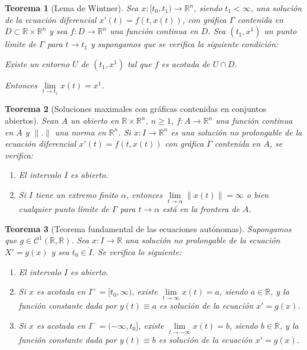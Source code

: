 \documentclass{report}
\newtheorem{theorem}{Teorema}[chapter]
\theoremstyle{remark}
\theoremstyle{remark}
\theoremstyle{remark}
\theoremstyle{definition}
\theoremstyle{definition}
\theoremstyle{definition}
\begin{document}
\begin{theorem}[Lema de Wintner]
    Sea $x: [t_0, t_1) \to \mathbb{R}^n$, siendo $t_1 < \infty$, una solución de la ecuación diferencial $x'(t) = f(t, x(t))$, con gráfica $\Gamma$ contenida en $D \subset \mathbb{R} \times \mathbb{R}^n$ y sea $f: D \to \mathbb{R}^n$ una función continua en $D$.
    Sea $(t_1, x^1)$ un punto límite de $\Gamma$ para $t \to t_1$ y supongamos que se verifica la siguiente condición:
    \begin{center}
        Existe un entorno $U$ de $(t_1, x^1)$ tal que $f$ es acotada de $U \cap D$.
    \end{center}

    Entonces $\lim\limits_{t \to t_1} x(t) = x^1$.
\end{theorem}

\begin{theorem}[Soluciones maximales con gráficas contenidas en conjuntos abiertos]
    Sean $A$ un abierto en $\mathbb{R} \times \mathbb{R}^n$, $n \geq 1$, $f: A \to \mathbb{R}^n$ una función continua en $A$ y $\|.\|$ una norma en $\mathbb{R}^n$.
    Si $x: I \to \mathbb{R}^n$ es una solución no prolongable de la ecuación diferencial $x'(t) = f(t, x(t))$ con gráfica $\Gamma$ contenida en $A$, se verifica:
    \begin{enumerate}
        \item El intervalo $I$ es abierto.
        \item Si $I$ tiene un extremo finito $\alpha$, entonces $\lim\limits_{t \to \alpha} \|x(t)\| = \infty$ o bien cualquier punto límite de $\Gamma$ para $t \to \alpha$ está en la frontera de $A$.
    \end{enumerate}
\end{theorem}

\begin{theorem}[Teorema fundamental de las ecuaciones autónomas]
    Supongamos que $g \in \mathcal{C}^1(\mathbb{R}, \mathbb{R})$.
    Sea $x: I \to \mathbb{R}$ una solución no prolongable de la ecuación $X' = g(x)$ y sea $t_0 \in \dot{I}$.
    Se verifica lo siguiente:
    \begin{enumerate}
        \item El intervalo $I$ es abierto.
        \item Si $x$ es acotada en $I^+ = [t_0, \infty)$, existe $\lim\limits_{t \to \infty} x(t) = a$, siendo $a \in \mathbb{R}$, y la función constante dada por $y(t) \equiv a$ es solución de la ecuación $x' = g(x)$.
        \item Si $x$ es acotada en $I^- = (-\infty, t_0]$, existe $\lim\limits_{t \to -\infty} x(t) = b$, siendo $b \in \mathbb{R}$, y la función constante dada por $y(t) \equiv b$ es solución de la ecuación $x' = g(x)$.
    \end{enumerate}
\end{theorem}
\end{document}
